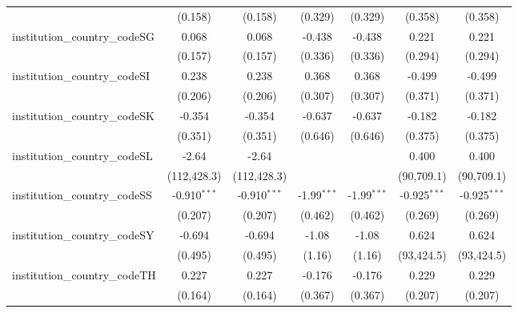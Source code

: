\begin{tabular}{lcccccc}
                                         & (0.158)        & (0.158)        & (0.329)        & (0.329)        & (0.358)        & (0.358)\\   
   institution\_country\_codeSG          & 0.068          & 0.068          & -0.438         & -0.438         & 0.221          & 0.221\\   
                                         & (0.157)        & (0.157)        & (0.336)        & (0.336)        & (0.294)        & (0.294)\\   
   institution\_country\_codeSI          & 0.238          & 0.238          & 0.368          & 0.368          & -0.499         & -0.499\\   
                                         & (0.206)        & (0.206)        & (0.307)        & (0.307)        & (0.371)        & (0.371)\\   
   institution\_country\_codeSK          & -0.354         & -0.354         & -0.637         & -0.637         & -0.182         & -0.182\\   
                                         & (0.351)        & (0.351)        & (0.646)        & (0.646)        & (0.375)        & (0.375)\\   
   institution\_country\_codeSL          & -2.64          & -2.64          &                &                & 0.400          & 0.400\\   
                                         & (112,428.3)    & (112,428.3)    &                &                & (90,709.1)     & (90,709.1)\\   
   institution\_country\_codeSS          & -0.910$^{***}$ & -0.910$^{***}$ & -1.99$^{***}$  & -1.99$^{***}$  & -0.925$^{***}$ & -0.925$^{***}$\\   
                                         & (0.207)        & (0.207)        & (0.462)        & (0.462)        & (0.269)        & (0.269)\\   
   institution\_country\_codeSY          & -0.694         & -0.694         & -1.08          & -1.08          & 0.624          & 0.624\\   
                                         & (0.495)        & (0.495)        & (1.16)         & (1.16)         & (93,424.5)     & (93,424.5)\\   
   institution\_country\_codeTH          & 0.227          & 0.227          & -0.176         & -0.176         & 0.229          & 0.229\\   
                                         & (0.164)        & (0.164)        & (0.367)        & (0.367)        & (0.207)        & (0.207)\\   

\end{tabular}
